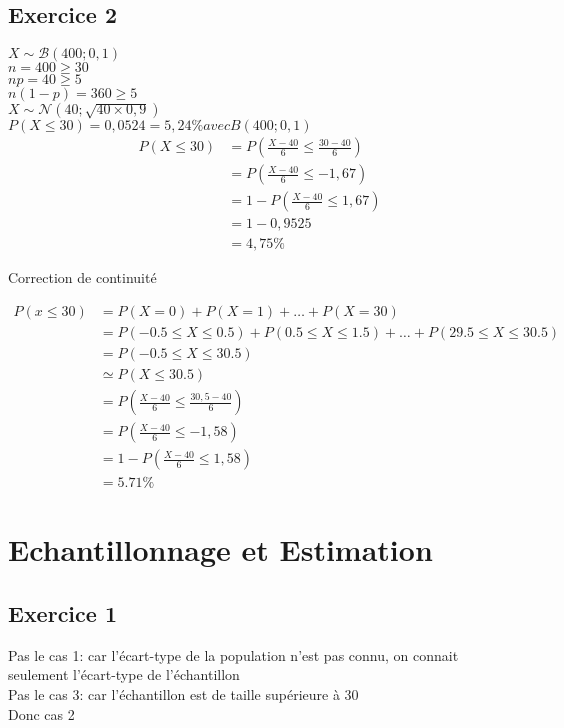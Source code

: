 \documentclass[12pt]{report}
\begin{document}
\section{Exercice 2}

$X \sim \mathcal{B}(400;0,1)$\\
$n = 400 \geq 30$\\
$np = 40 \geq 5$\\
$n(1-p) = 360 \geq 5$\\
$X \sim \mathcal{N}(40;\sqrt{40\times 0,9})$\\
$P(X\leq 30) = 0,0524 = 5,24\% avec B(400;0,1)$\\
\begin{align*}
    P(X \leq 30) &= P( \frac{X-40}{6} \leq \frac{30-40}{6})\\
    &= P(\frac{X-40}{6}\leq  -1,67)\\
    &= 1 - P(\frac{X-40}{6} \leq 1,67)\\
    &= 1-0,9525\\
    &=4,75\%   
\end{align*}

Correction de continuité

\begin{align*}
    P(x \leq 30) &= P(X=0) + P(X=1) + \dots + P(X =30)\\
    &= P( -0.5 \leq X \leq 0.5) + P( 0.5 \leq X \leq 1.5) + \dots + P( 29.5 \leq X \leq 30.5)\\
    &= P(-0.5 \leq X \leq 30.5)\\
    &\simeq P(X \leq 30.5)\\
    & = P(\frac{X-40}{6} \leq \frac{30,5-40}{6})\\
    & = P(\frac{X-40}{6} \leq -1,58)\\
    & = 1- P(\frac{X-40}{6} \leq 1,58)\\
    & = 5.71\%
\end{align*}
 
\chapter{Echantillonnage et Estimation}

\section{Exercice 1}

Pas le cas 1: car l'écart-type de la population n'est pas connu, on connait seulement l'écart-type de l'échantillon\\
Pas le cas 3: car l'échantillon est de taille supérieure à 30\\
Donc cas 2\\
\end{document}
